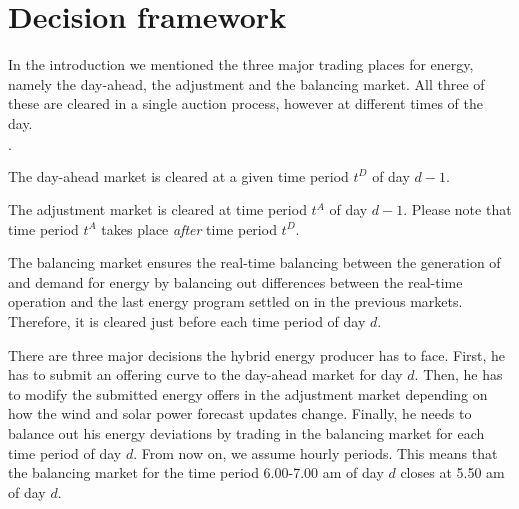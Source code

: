 \section{Decision framework}
In the introduction we mentioned the three major trading places for energy, namely the day-ahead, the adjustment and the balancing market. All three of these are cleared in a single auction process, however at different times of the day. 

\begin{list}{$\cdot$}{}
	\item The day-ahead market is cleared at a given time period $t^D$ of day $d-1$.
	\item The adjustment market is cleared at time period $t^{A}$ of day $d-1$. Please note that time period $t^{A}$ takes place \textit{after} time period $t^{D}$.
	\item The balancing market ensures the real-time balancing between the generation of and demand for energy by balancing out differences between the real-time operation and the last energy program settled on in the previous markets. Therefore, it is cleared just before each time period of day $d$. 
\end{list}
There are three major decisions the hybrid energy producer has to face. First, he has to submit an offering curve to the day-ahead market for day $d$.  Then, he has to modify the submitted energy offers in the adjustment market depending on how the wind and solar power forecast updates change.  Finally, he needs to balance out his energy deviations by trading in the balancing market for each time period of day $d$. From now on, we assume hourly periods. This means that the balancing market for the time period 6.00-7.00 am of day $d$ closes at 5.50 am of day $d$. 
\\

